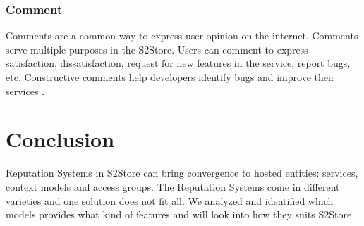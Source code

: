 \subsubsection{Comment}

Comments are a common way to express user opinion on the internet. Comments serve multiple purposes in the S2Store. Users can comment to express satisfaction, dissatisfaction, request for new features in the service, report bugs, etc. Constructive comments help developers identify bugs and improve their services \cite{pagano2013user}.

\section*{Conclusion}

Reputation Systems in S2Store can bring convergence to hosted entities: services, context models and access groups. The Reputation Systems come in different varieties and one solution does not fit all. We analyzed and identified which models provides what kind of features and will look into how they suits S2Store.
